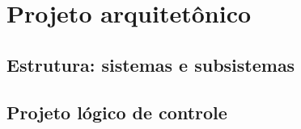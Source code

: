 \section{Projeto arquitetônico}

\subsection{Estrutura: sistemas e subsistemas}

\subsection{Projeto lógico de controle}
